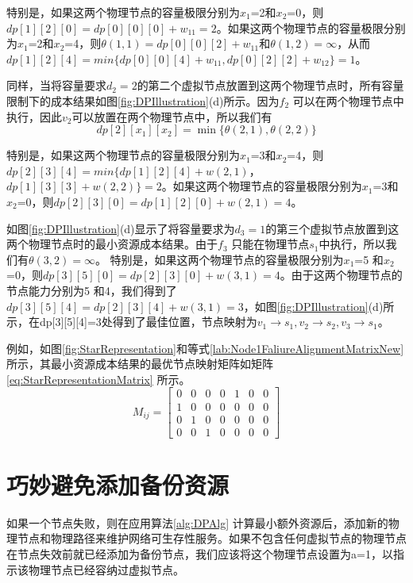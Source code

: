 特别是，如果这两个物理节点的容量极限分别为$x_1$=2和$x_2$=0，则$dp[1][2][0]= dp[0][0][0]+w_{11}=2$。如果这两个物理节点的容量极限分别为$x_1$=2和$x_2$=4，则$\theta (1,1)=dp[0][0][2]+w_{11}$和$\theta (1,2)=\infty$，从而$dp[1][2][4]=min\{ dp[0][0][4]+w_{11}, dp[0][2][2]+w_{12} \}=1$。

同样，当将容量要求$d_2=2$的第二个虚拟节点放置到这两个物理节点时，所有容量限制下的成本结果如图\ref{fig:DPIllustration}(d)所示。因为$f_2$ 可以在两个物理节点中执行，因此$v_2$可以放置在两个物理节点中，所以我们有
\begin{equation}
dp[2][{x_1}][{x_2}] = \min \{\theta (2,1),\theta (2,2)\}
\end{equation}


特别是，如果这两个物理节点的容量极限分别为$x_1$=3和$x_2$=4，则$dp[2][3][4]=min\{dp[1][2][4]+w(2,1)$，$dp[1][3][3]+w(2,2)\}=2$。如果这两个物理节点的容量极限分别为$x_1$=3和$x_2$=0，则$dp[2][3][0]=dp[1][2][0]+w(2,1)=4$。

如图\ref{fig:DPIllustration}(d)显示了将容量要求为$d_3=1$的第三个虚拟节点放置到这两个物理节点时的最小资源成本结果。由于$f_3$ 只能在物理节点$s_1$中执行，所以我们有$\theta (3,2)=\infty$。 特别是，如果这两个物理节点的容量极限分别为$x_1$=5 和$x_2$=0，则$dp[3][5][0]=dp[2][3][0]+w(3,1)=4$。由于这两个物理节点的节点能力分别为5 和4，我们得到了$dp[3][5][4]=dp[2][3][4]+w(3,1)=3$，如图\ref{fig:DPIllustration}(d)所示，在dp[3][5][4]=3处得到了最佳位置，节点映射为$v_1\rightarrow s_1, v_2\rightarrow s_2, v_3\rightarrow s_1$。

例如，如图\ref{fig:StarRepresentation}和等式\ref{lab:Node1FaliureAlignmentMatrixNew} 所示，其最小资源成本结果的最优节点映射矩阵如矩阵\ref{eq:StarRepresentationMatrix} 所示。
\begin{equation}
M_{ij}=\left[ {\begin{array}{*{20}{c}}
0&0&0&0&1&0&0\\
1&0&0&0&0&0&0\\
0&1&0&0&0&0&0\\
0&0&1&0&0&0&0
\end{array}} \right]
\label{eq:StarRepresentationMatrix}
\end{equation}
\section{巧妙避免添加备份资源}
如果一个节点失败，则在应用算法\ref{alg:DPAlg} 计算最小额外资源后，添加新的物理节点和物理路径来维护网络可生存性服务。如果不包含任何虚拟节点的物理节点在节点失效前就已经添加为备份节点，我们应该将这个物理节点设置为a=1，以指示该物理节点已经容纳过虚拟节点。

